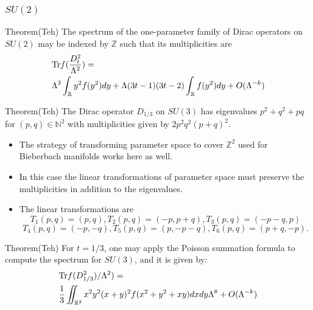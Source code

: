 \documentclass{beamer}
\def\N{{\mathbb N}}
\def\Z{{\mathbb Z}}
\def\R{{\mathbb R}}
\def\Tr{{\rm Tr}}
\begin{document}
\begin{frame}
	\frametitle{$SU(2)$}
  \begin{block}{Theorem(Teh)}
	The spectrum of the one-parameter family of Dirac operators on $SU(2)$ may be indexed by $\Z$ such that its multiplicities are 
	\begin{align*}
		& \Tr f( \frac{D_t ^2}{\Lambda ^2}) = \\ 
		&\Lambda ^3 \int_{\R}y^2 f(y^2) dy + \Lambda(3t-1)(3t-2)\int_\R f(y^2) dy + O(\Lambda^{-k})
	\end{align*}
  \end{block}
\end{frame}

\begin{frame}
  \begin{block}{Theorem(Teh)}
    The Dirac operator $D_{1/3}$ on $SU(3)$ has eigenvalues $p^2 + q^2 + pq$ for $(p,q) \in \N^2$ with multiplicities given by $2p^2q^2(p+q)^2$.
  \end{block}

  \begin{block}{}
    \begin{itemize}
      \item The strategy of transforming parameter space to cover $\Z^2$ used for Bieberbach manifolds works here as well.
      \item In this case the linear transformations of parameter space must preserve the multiplicities in addition to the eigenvalues.
      \item The linear transformations are 
\[
T_1 (p,q) = (p,q), T_2(p,q) = (-p,p+q), T_3(p,q) = (-p-q,p)
\]
\[T_4(p,q) = (-p,-q),  T_5(p,q) = (p,-p-q), T_6(p,q) = (p+q,-p).
\]
    \end{itemize}
  \end{block}
\end{frame}

\begin{frame}
  \begin{block}{Theorem(Teh)}
    For $t = 1/3$, one may apply the Poisson summation formula to compute the spectrum for $SU(3)$, and it is given by:
    \begin{align*}
      & \Tr f(D_{1/3}^2)/\Lambda ^2) = \\
                                   & \frac{1}{3}\iint_{\R ^2} x^2y^2(x+y)^2f(x^2+y^2+xy)dxdy \Lambda^8 + O(\Lambda ^{-k})
    \end{align*}
  \end{block}
\end{frame}
\end{document}
